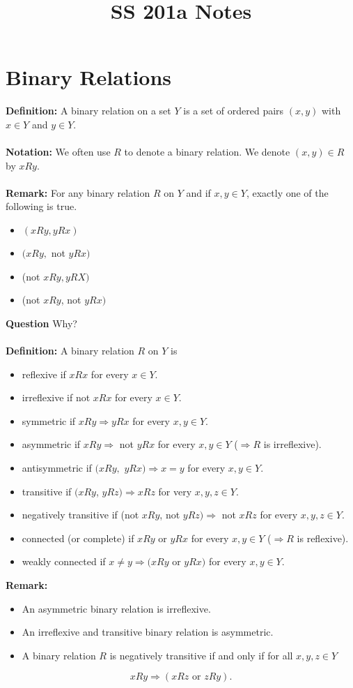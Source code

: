 \documentclass[10pt,a4paper,oneside]{article}
\begin{document}
\author{}
\title{SS 201a Notes}
\date{}
\maketitle

\newtheorem{Thm}{Theorem}
\section{Binary Relations}
{\bf Definition:} A binary relation on a set $Y$ is a set of ordered pairs $(x,y)$ with $x \in Y$ and $y \in Y$.\\ \\
{\bf Notation:} We often use $R$ to denote a binary relation. We denote $(x,y) \in R$ by $xRy$.\\ \\
{\bf Remark:} For any binary relation $R$ on $Y$ and if $x,y \in Y$, exactly one of the following is true.
	\begin{itemize}
		\item $(xRy, yRx)$
		\item $(xRy,$ not $yRx)$
		\item (not $xRy, yRX)$
		\item (not $xRy$, not $yRx)$
	\end{itemize}
{\bf Question} Why?\\ \\
{\bf Definition:} A binary relation $R$ on $Y$ is 
	\begin{itemize}
		\item reflexive if $xRx$ for every $x \in Y$.
		\item irreflexive if not $xRx$ for every $x \in Y$.
		\item symmetric if $xRy \Rightarrow yRx$ for every $x,y \in Y$.
		\item asymmetric if $xRy \Rightarrow$ not $yRx$ for every $x,y \in Y$ ($\Rightarrow R$ is irreflexive).
		\item antisymmetric if $(xRy,$ $yRx) \Rightarrow x=y$ for every $x,y \in Y$.
		\item transitive if $(xRy$, $yRz) \Rightarrow xRz$ for very $x,y,z \in Y$.
		\item negatively transitive if (not $xRy$, not $yRz) \Rightarrow $ not $xRz$ for every $x,y,z\in Y$.
		\item connected (or complete) if $xRy$ or $yRx$ for every $x,y \in Y$ ($\Rightarrow R$ is reflexive).
		\item weakly connected if $x \neq y \Rightarrow (xRy$ or $yRx)$ for every $x,y \in Y$.
	\end{itemize}
{\bf Remark:}
	\begin{itemize}
		\item An asymmetric binary relation is irreflexive.
		\item An irreflexive and transitive binary relation is asymmetric.
		\item A binary relation $R$ is negatively transitive if and only if for all $x,y,z \in Y$
	\end{itemize}
$$xRy \Rightarrow (xRz \text{ or }zRy).$$
\end{document}
